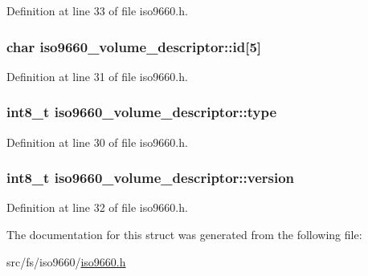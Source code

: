 Definition at line 33 of file iso9660.\+h.

\hypertarget{structiso9660__volume__descriptor_a8f6d3d0d6c09036a09ba6236fcadef24}{
\subsubsection[{id}]{\setlength{\rightskip}{0pt plus 5cm}char iso9660\+\_\+volume\+\_\+descriptor\+::id\mbox{[}5\mbox{]}}}\label{structiso9660__volume__descriptor_a8f6d3d0d6c09036a09ba6236fcadef24}


Definition at line 31 of file iso9660.\+h.

\hypertarget{structiso9660__volume__descriptor_a4a6176bdba9bffc0ce8449819ea0607b}{
\subsubsection[{type}]{\setlength{\rightskip}{0pt plus 5cm}int8\+\_\+t iso9660\+\_\+volume\+\_\+descriptor\+::type}}\label{structiso9660__volume__descriptor_a4a6176bdba9bffc0ce8449819ea0607b}


Definition at line 30 of file iso9660.\+h.

\hypertarget{structiso9660__volume__descriptor_a925c16dc5ba2782b30213c5bb5654f0d}{
\subsubsection[{version}]{\setlength{\rightskip}{0pt plus 5cm}int8\+\_\+t iso9660\+\_\+volume\+\_\+descriptor\+::version}}\label{structiso9660__volume__descriptor_a925c16dc5ba2782b30213c5bb5654f0d}


Definition at line 32 of file iso9660.\+h.



The documentation for this struct was generated from the following file\+:\begin{DoxyCompactItemize}
\item 
src/fs/iso9660/\hyperlink{iso9660_8h}{iso9660.\+h}\end{DoxyCompactItemize}
